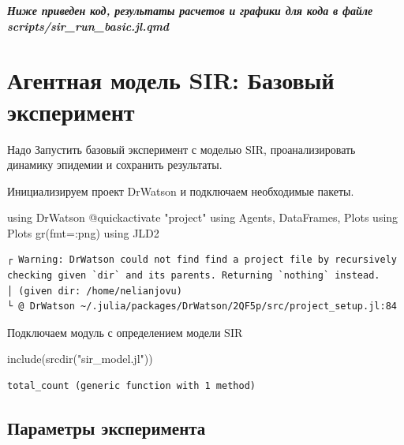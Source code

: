 \documentclass[
  12pt,
  a4paper,
  DIV=11,
  numbers=noendperiod]{scrreprt}
\newenvironment{Shaded}{\begin{snugshade}}{\end{snugshade}}
\newcommand{\BuiltInTok}[1]{\textcolor[rgb]{0.00,0.23,0.31}{#1}}
\newcommand{\FunctionTok}[1]{\textcolor[rgb]{0.28,0.35,0.67}{#1}}
\newcommand{\ImportTok}[1]{\textcolor[rgb]{0.00,0.46,0.62}{#1}}
\newcommand{\NormalTok}[1]{\textcolor[rgb]{0.00,0.23,0.31}{#1}}
\newcommand{\OperatorTok}[1]{\textcolor[rgb]{0.37,0.37,0.37}{#1}}
\newcommand{\PreprocessorTok}[1]{\textcolor[rgb]{0.68,0.00,0.00}{#1}}
\newcommand{\StringTok}[1]{\textcolor[rgb]{0.13,0.47,0.30}{#1}}
\begin{document}
\textbf{\emph{Ниже приведен код, результаты расчетов и графики для кода
в файле scripts/sir\_run\_basic.jl.qmd}}

\chapter{Агентная модель SIR: Базовый
эксперимент}\label{ux430ux433ux435ux43dux442ux43dux430ux44f-ux43cux43eux434ux435ux43bux44c-sir-ux431ux430ux437ux43eux432ux44bux439-ux44dux43aux441ux43fux435ux440ux438ux43cux435ux43dux442}

Надо Запустить базовый эксперимент с моделью SIR, проанализировать
динамику эпидемии и сохранить результаты.

Инициализируем проект DrWatson и подключаем необходимые пакеты.

\begin{Shaded}
\begin{Highlighting}[]
\ImportTok{using} \BuiltInTok{DrWatson}
\PreprocessorTok{@quickactivate} \StringTok{"project"}
\ImportTok{using} \BuiltInTok{Agents}\NormalTok{, }\BuiltInTok{DataFrames}\NormalTok{, }\BuiltInTok{Plots}
\ImportTok{using} \BuiltInTok{Plots}
\FunctionTok{gr}\NormalTok{(fmt}\OperatorTok{=:}\NormalTok{png)}
\ImportTok{using} \BuiltInTok{JLD2}
\end{Highlighting}
\end{Shaded}

\begin{verbatim}
┌ Warning: DrWatson could not find find a project file by recursively checking given `dir` and its parents. Returning `nothing` instead.
│ (given dir: /home/nelianjovu)
└ @ DrWatson ~/.julia/packages/DrWatson/2QF5p/src/project_setup.jl:84
\end{verbatim}

Подключаем модуль с определением модели SIR

\begin{Shaded}
\begin{Highlighting}[]
\FunctionTok{include}\NormalTok{(}\FunctionTok{srcdir}\NormalTok{(}\StringTok{"sir\_model.jl"}\NormalTok{))}
\end{Highlighting}
\end{Shaded}

\begin{verbatim}
total_count (generic function with 1 method)
\end{verbatim}

\section{Параметры
эксперимента}\label{ux43fux430ux440ux430ux43cux435ux442ux440ux44b-ux44dux43aux441ux43fux435ux440ux438ux43cux435ux43dux442ux430}
\end{document}
